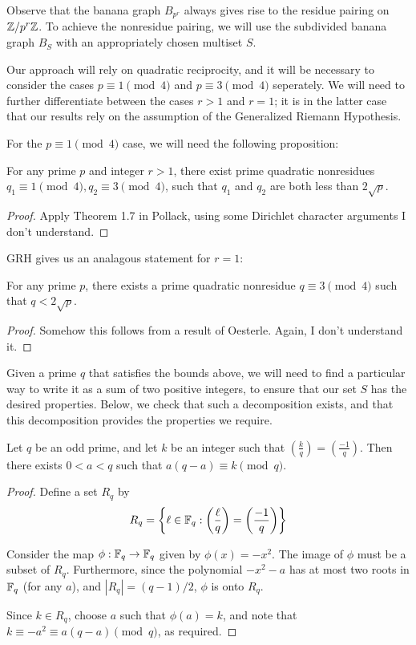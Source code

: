 \documentclass{amsart}
\begin{document}
Observe that the banana graph $B_{p^r}$ always gives rise to the
residue pairing on $\mathbb{Z}/p^r\mathbb{Z}$. To achieve the nonresidue pairing, we
will use the subdivided banana graph $B_S$ with an appropriately
chosen multiset $S$.

Our approach will rely on quadratic reciprocity, and it will be
necessary to consider the cases $p \equiv 1 \pmod 4$ and $p \equiv 3
\pmod 4$ seperately. We will need to further differentiate between the
cases $r > 1$ and $r = 1$; it is in the latter case that our results
rely on the assumption of the Generalized Riemann Hypothesis.

For the $p \equiv 1 \pmod 4$ case, we will need the following
proposition:
\begin{prop}
  \label{prop:q_bound}
  For any prime $p$ and integer $r > 1$, there exist prime quadratic
  nonresidues $q_1 \equiv 1 \pmod 4, q_2 \equiv 3 \pmod 4$, such that
  $q_1$ and $q_2$ are both less than $2\sqrt{p}$.
\end{prop}
\begin{proof}
  Apply Theorem 1.7 in Pollack, using some Dirichlet character
  arguments I don't understand. 
\end{proof}

GRH gives us an analagous statement for $r=1$:
\begin{prop}
  \label{prop:q_bound_grh}
  For any prime $p$, there exists a prime quadratic nonresidue $q
  \equiv 3 \pmod 4$ such that $q < 2\sqrt{p}$.
\end{prop}
\begin{proof}
  Somehow this follows from a result of Oesterle. Again, I don't
  understand it.
\end{proof}

Given a prime $q$ that satisfies the bounds above, we will need to
find a particular way to write it as a sum of two positive integers,
to ensure that our set $S$ has the desired properties. Below, we check
that such a decomposition exists, and that this decomposition provides
the properties we require.

\begin{lem}
  \label{lem:decompose_q}
  Let $q$ be an odd prime, and let $k$ be an integer such that
  $\left(\frac{k}{q}\right) = \left(\frac{-1}{q}\right)$. Then there
  exists $0 < a < q$ such that $a(q-a) \equiv k \pmod q$. 
\end{lem}

\begin{proof}
  Define a set $R_q$ by 
  \begin{equation*}
    R_q = \left\{\ell \in \mathbb{F}_q : \left(\frac{\ell}{q}\right) = 
    \left(\frac{-1}{q}\right)\right\}
  \end{equation*}
  
  Consider the map $\phi:\mathbb{F}_q \to \mathbb{F}_q$ given by $\phi(x) = -x^2$. The
  image of $\phi$ must be a subset of $R_q$. Furthermore, since the
  polynomial $-x^2 - a$ has at most two roots in $\mathbb{F}_q$ (for any $a$),
  and $|R_q| = (q - 1)/2$, $\phi$ is onto $R_q$.

  Since $k \in R_q$, choose $a$ such that $\phi(a) = k$, and note
  that $k \equiv -a^2 \equiv a(q-a) \pmod q$, as required.
\end{proof}
\end{document}
